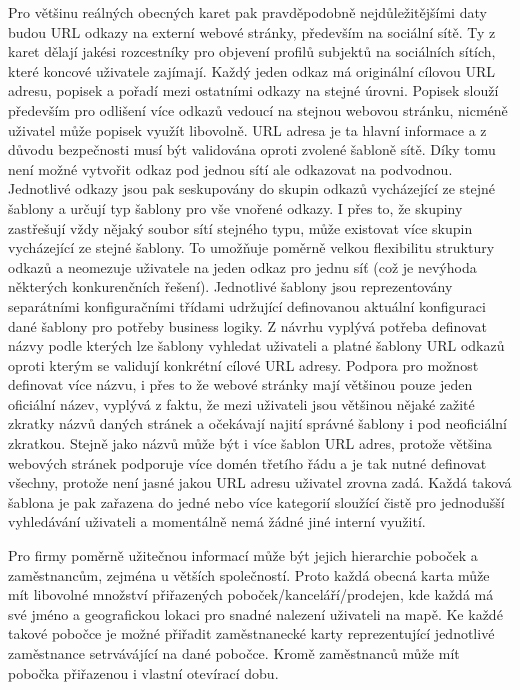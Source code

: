 \begin{itemize}
\begin{itemize}
		Pro většinu reálných obecných karet pak pravděpodobně nejdůležitějšími daty budou \ac{URL} odkazy na externí webové stránky,
		především na sociální sítě.
		Ty z karet dělají jakési rozcestníky pro objevení profilů subjektů na sociálních sítích, které koncové uživatele zajímají.
		Každý jeden odkaz má originální cílovou \ac{URL} adresu, popisek a pořadí mezi ostatními odkazy na stejné úrovni.
		Popisek slouží především pro odlišení více odkazů vedoucí na stejnou webovou stránku, nicméně uživatel může popisek
		využít libovolně.
		\ac{URL} adresa je ta hlavní informace a z důvodu bezpečnosti musí být validována oproti zvolené šabloně sítě.
		Díky tomu není možné vytvořit odkaz pod jednou sítí ale odkazovat na podvodnou.
		Jednotlivé odkazy jsou pak seskupovány do skupin odkazů vycházející ze stejné šablony a určují typ šablony pro vše
		vnořené odkazy.
		I přes to, že skupiny zastřešují vždy nějaký soubor sítí stejného typu, může existovat více skupin vycházející ze
		stejné šablony.
		To umožňuje poměrně velkou flexibilitu struktury odkazů a neomezuje uživatele na jeden odkaz pro jednu síť (což je
		nevýhoda některých konkurenčních řešení).
		Jednotlivé šablony jsou reprezentovány separátními konfiguračními třídami udržující definovanou aktuální konfiguraci
		dané šablony pro potřeby business logiky.
		Z návrhu vyplývá potřeba definovat názvy podle kterých lze šablony vyhledat uživateli a platné šablony \ac{URL} odkazů
		oproti kterým se validují konkrétní cílové \ac{URL} adresy.
		Podpora pro možnost definovat více názvu, i přes to že webové stránky mají většinou pouze jeden oficiální název,
		vyplývá z faktu, že mezi uživateli jsou většinou nějaké zažité zkratky názvů daných stránek a očekávají najití
		správné šablony i pod neoficiální zkratkou.
		Stejně jako názvů může být i více šablon \ac{URL} adres, protože většina webových stránek podporuje více domén třetího řádu
		a je tak nutné definovat všechny, protože není jasné jakou \ac{URL} adresu uživatel zrovna zadá.
		Každá taková šablona je pak zařazena do jedné nebo více kategorií sloužící čistě pro jednodušší vyhledávání uživateli
		a momentálně nemá žádné jiné interní využití.

		Pro firmy poměrně užitečnou informací může být jejich hierarchie poboček a zaměstnancům, zejména u větších společností.
		Proto každá obecná karta může mít libovolné množství přiřazených poboček/kanceláří/prodejen, kde každá má své jméno
		a geografickou lokaci pro snadné nalezení uživateli na mapě.
		Ke každé takové pobočce je možné přiřadit zaměstnanecké karty reprezentující jednotlivé zaměstnance setrvávájící
		na dané pobočce.
		Kromě zaměstnanců může mít pobočka přiřazenou i vlastní otevírací dobu.


\end{itemize}
\end{itemize}
